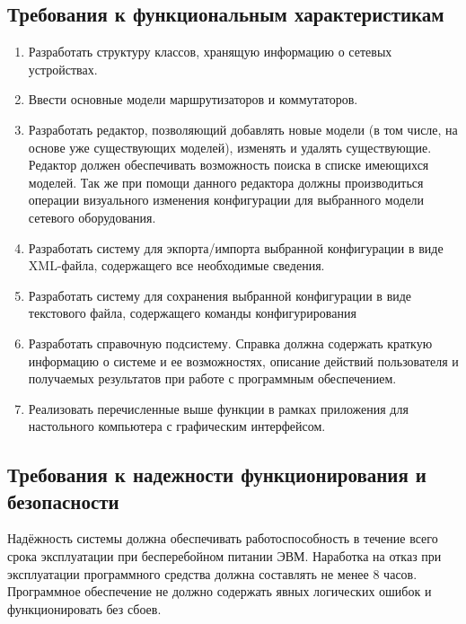 \documentclass[a4paper,14pt]{extreport}
\begin{document}
	\subsection{Требования к функциональным характеристикам}
	
	\begin{enumerate}
		\item Разработать структуру классов, хранящую информацию о сетевых устройствах.
		
		\item Ввести основные модели маршрутизаторов и коммутаторов.
		
		\item Разработать редактор, позволяющий добавлять новые модели (в том числе, на основе уже существующих моделей), изменять и удалять существующие. Редактор должен обеспечивать возможность поиска в списке имеющихся моделей. Так же при помощи данного редактора должны производиться операции визуального изменения конфигурации для выбранного модели сетевого оборудования.
		
		\item Разработать систему для экпорта/импорта выбранной конфигурации в виде XML-файла, содержащего все необходимые сведения.
		
		\item Разработать систему для сохранения выбранной конфигурации в виде текстового файла, содержащего команды конфигурирования
		
		\item Разработать справочную подсистему. Справка должна содержать краткую информацию о системе и ее возможностях, описание действий пользователя и получаемых результатов при работе с программным обеспечением.
		
		\item Реализовать перечисленные выше функции в рамках приложения для настольного компьютера с графическим интерфейсом.
	\end{enumerate}
	
	\subsection{Требования к надежности функционирования и безопасности}
	
	Надёжность системы должна обеспечивать работоспособность в течение всего срока эксплуатации при бесперебойном питании ЭВМ. Наработка на отказ при эксплуатации программного средства должна составлять не менее 8 часов. Программное обеспечение не должно содержать явных логических ошибок и функционировать без сбоев.
	
\end{document}
